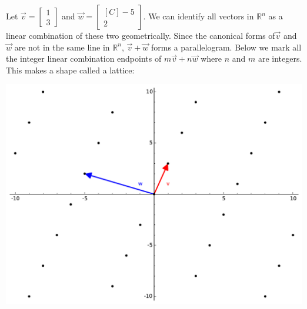 \begin{example} 
Let $\vec{v}=\begin{bmatrix} 1 \\ 3 \end{bmatrix}$ and $\vec{w}=\begin{bmatrix*}[C] -5 \\ 2 \end{bmatrix*}$. We can identify all vectors in $\mathbb{R}^n$ as a linear combination of these two geometrically. Since the canonical forms of$\vec{v}$ and $\vec{w}$ are not in the same line in $\mathbb{R}^n$, $\vec{v}+\vec{w}$ forms a parallelogram. Below we mark all the integer linear combination endpoints of $m\vec{v}+n\vec{w}$ where $n$ and $m$ are integers. This makes a shape called a lattice:
\begin{center}
\includegraphics[scale=.5]{Rn/vw_graph1.pdf}
\end{center}


\end{example}
